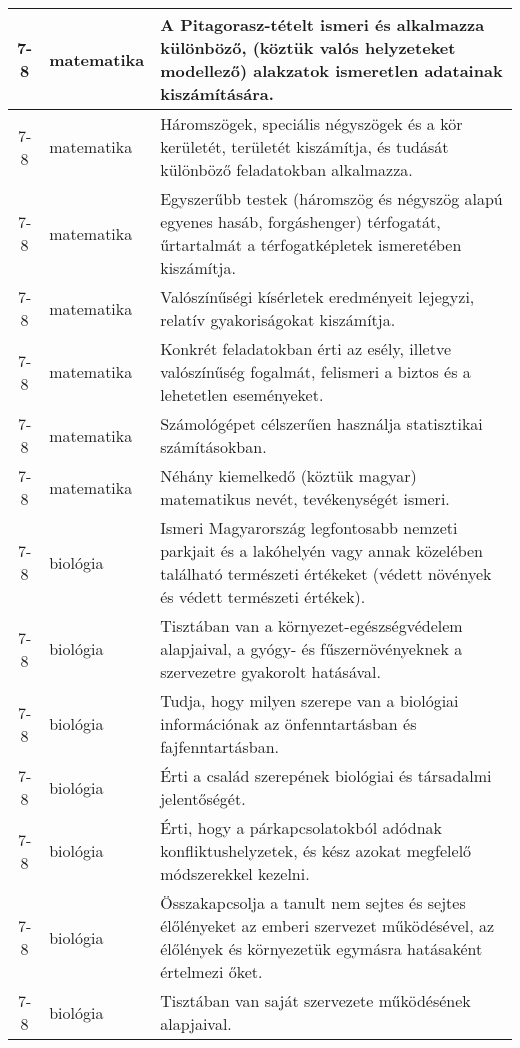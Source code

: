 \begin{small}
\begin{longtable}{c | p{2cm} |  p{11cm} }
              7-8 & matematika & A Pitagorasz-tételt ismeri és alkalmazza különböző, (köztük valós helyzeteket modellező) alakzatok ismeretlen adatainak kiszámítására. \\ \hline
              7-8 & matematika & Háromszögek, speciális négyszögek és a kör kerületét, területét kiszámítja, és tudását különböző feladatokban alkalmazza. \\ \hline
              7-8 & matematika & Egyszerűbb testek (háromszög és négyszög alapú egyenes hasáb, forgáshenger) térfogatát, űrtartalmát a térfogatképletek ismeretében kiszámítja. \\ \hline
              7-8 & matematika & Valószínűségi kísérletek eredményeit lejegyzi, relatív gyakoriságokat kiszámítja. \\ \hline
              7-8 & matematika & Konkrét feladatokban érti az esély, illetve valószínűség fogalmát, felismeri a biztos és a lehetetlen eseményeket. \\ \hline
              7-8 & matematika & Számológépet célszerűen használja statisztikai számításokban. \\ \hline
              7-8 & matematika & Néhány kiemelkedő (köztük magyar) matematikus nevét, tevékenységét ismeri. \\ \hline
              7-8 & biológia & Ismeri Magyarország legfontosabb nemzeti parkjait és a lakóhelyén vagy annak közelében található természeti értékeket (védett növények és védett természeti értékek). \\ \hline
              7-8 & biológia & Tisztában van a környezet-egészségvédelem alapjaival, a gyógy- és fűszernövényeknek a szervezetre gyakorolt hatásával. \\ \hline
              7-8 & biológia & Tudja, hogy milyen szerepe van a biológiai információnak az önfenntartásban és fajfenntartásban. \\ \hline
              7-8 & biológia & Érti a család szerepének biológiai és társadalmi jelentőségét. \\ \hline
              7-8 & biológia & Érti, hogy a párkapcsolatokból adódnak konfliktushelyzetek, és kész azokat megfelelő módszerekkel kezelni. \\ \hline
              7-8 & biológia & Összakapcsolja a tanult nem sejtes és sejtes élőlényeket az emberi szervezet működésével, az élőlények és környezetük egymásra hatásaként értelmezi őket. \\ \hline
              7-8 & biológia & Tisztában van saját szervezete működésének alapjaival. \\ \hline

\end{longtable}
\end{small}

